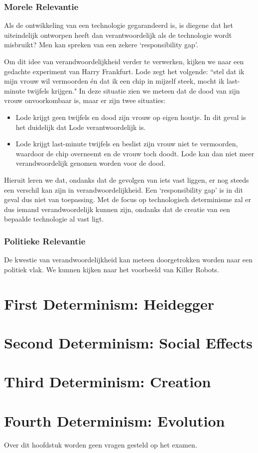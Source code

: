 \documentclass[../summary.tex]{subfiles}
\begin{document}
	\subsubsection{Morele Relevantie}
	Als de ontwikkeling van een technologie gegarandeerd is, is diegene dat het uiteindelijk ontworpen heeft dan verantwoordelijk als de technologie wordt misbruikt? Men kan spreken van een zekere `responsibility gap'.
	
	Om dit idee van verandwoordelijkheid verder te verwerken, kijken we naar een gedachte experiment van Harry Frankfurt. Lode zegt het volgende: ``stel dat ik mijn vrouw wil vermoorden én dat ik een chip in mijzelf steek, mocht ik last-minute twijfels krijgen." In deze situatie zien we meteen dat de dood van zijn vrouw onvoorkombaar is, maar er zijn twee situaties:
	\begin{itemize}
		\item Lode krijgt geen twijfels en dood zijn vrouw op eigen houtje. In dit geval is het duidelijk dat Lode verantwoordelijk is.
		\item Lode krijgt last-minute twijfels en beslist zijn vrouw niet te vermoorden, waardoor de chip overneemt en de vrouw toch doodt. Lode kan dan niet meer verandwoordelijk genomen worden voor de dood.
	\end{itemize}
	Hieruit leren we dat, ondanks dat de gevolgen van iets vast liggen, er nog steeds een verschil kan zijn in verandwoordelijkheid. Een `responsibility gap' is in dit geval dus niet van toepassing. Met de focus op technologisch determinisme zal er dus iemand verandwoordelijk kunnen zijn, ondanks dat de creatie van een bepaalde technologie al vast ligt.
	
	\subsubsection{Politieke Relevantie}
	 De kwestie van verandwoordelijkheid kan meteen doorgetrokken worden naar een politiek vlak. We kunnen kijken naar het voorbeeld van Killer Robots.
	
	\section{First Determinism: Heidegger}
	
	
	\section{Second Determinism: Social Effects}
	
	\section{Third Determinism: Creation}
	
	\section{Fourth Determinism: Evolution}
	Over dit hoofdstuk worden geen vragen gesteld op het examen.
		
\end{document}
